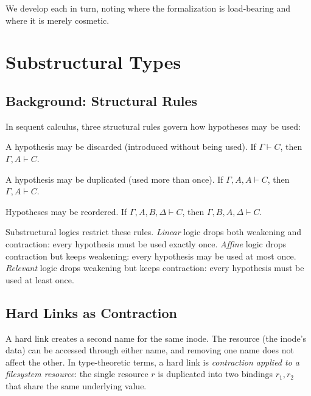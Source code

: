\documentclass[11pt]{article}
\begin{document}
We develop each in turn, noting where the formalization is load-bearing and
where it is merely cosmetic.

\section{Substructural Types}

\subsection{Background: Structural Rules}

In sequent calculus, three structural rules govern how hypotheses may be used:

\begin{description}[style=nextline]
  \item[Weakening] A hypothesis may be discarded (introduced without being
    used). If $\Gamma \vdash C$, then $\Gamma, A \vdash C$.
  \item[Contraction] A hypothesis may be duplicated (used more than once). If
    $\Gamma, A, A \vdash C$, then $\Gamma, A \vdash C$.
  \item[Exchange] Hypotheses may be reordered. If $\Gamma, A, B, \Delta \vdash
    C$, then $\Gamma, B, A, \Delta \vdash C$.
\end{description}

Substructural logics restrict these rules. \emph{Linear} logic drops both
weakening and contraction: every hypothesis must be used exactly once.
\emph{Affine} logic drops contraction but keeps weakening: every hypothesis may
be used at most once. \emph{Relevant} logic drops weakening but keeps
contraction: every hypothesis must be used at least once.

\subsection{Hard Links as Contraction}

A hard link creates a second name for the same inode. The resource (the
inode's data) can be accessed through either name, and removing one name does
not affect the other. In type-theoretic terms, a hard link is \emph{contraction
applied to a filesystem resource}: the single resource $r$ is duplicated into
two bindings $r_1, r_2$ that share the same underlying value.
\end{document}
